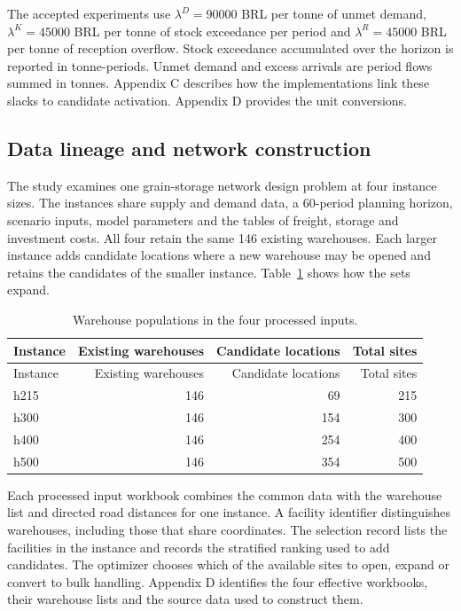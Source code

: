 \documentclass[
  english,
  11pt,
  a4paper,
  authoryear,
  preprint]{elsarticle}
\begin{document}
The accepted experiments use \(\lambda^D=90000\) BRL per tonne of unmet
demand, \(\lambda^K=45000\) BRL per tonne of stock exceedance per period
and \(\lambda^R=45000\) BRL per tonne of reception overflow. Stock
exceedance accumulated over the horizon is reported in tonne-periods.
Unmet demand and excess arrivals are period flows summed in tonnes.
Appendix C describes how the implementations link these slacks to
candidate activation. Appendix D provides the unit conversions.

\subsection{Data lineage and network
construction}\label{data-lineage-and-network-construction}

The study examines one grain-storage network design problem at four
instance sizes. The instances share supply and demand data, a 60-period
planning horizon, scenario inputs, model parameters and the tables of
freight, storage and investment costs. All four retain the same 146
existing warehouses. Each larger instance adds candidate locations where
a new warehouse may be opened and retains the candidates of the smaller
instance. Table~\ref{tbl-warehouse-populations} shows how the sets
expand.

\begin{longtable}[]{@{}lrrr@{}}
\caption{Warehouse populations in the four processed
inputs.}\label{tbl-warehouse-populations}\tabularnewline
\toprule\noalign{}
Instance & Existing warehouses & Candidate locations & Total sites \\
\midrule\noalign{}
\endfirsthead
\toprule\noalign{}
Instance & Existing warehouses & Candidate locations & Total sites \\
\midrule\noalign{}
\endhead
\bottomrule\noalign{}
\endlastfoot
h215 & 146 & 69 & 215 \\
h300 & 146 & 154 & 300 \\
h400 & 146 & 254 & 400 \\
h500 & 146 & 354 & 500 \\
\end{longtable}

Each processed input workbook combines the common data with the
warehouse list and directed road distances for one instance. A facility
identifier distinguishes warehouses, including those that share
coordinates. The selection record lists the facilities in the instance
and records the stratified ranking used to add candidates. The optimizer
chooses which of the available sites to open, expand or convert to bulk
handling. Appendix D identifies the four effective workbooks, their
warehouse lists and the source data used to construct them.
\end{document}

